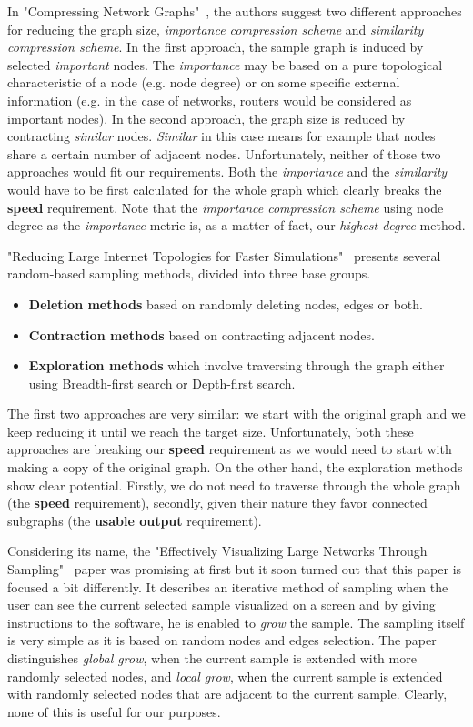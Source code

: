 In "Compressing Network Graphs"~\cite{gilbert2004compressing}, the authors suggest two different approaches for reducing the graph size, \emph{importance compression scheme} and \emph{similarity compression scheme}. In the first approach, the sample graph is induced by selected \emph{important} nodes. The \emph{importance} may be based on a pure topological characteristic of a node (e.g. node degree) or on some specific external information (e.g. in the case of networks, routers would be considered as important nodes). In the second approach, the graph size is reduced by contracting \emph{similar} nodes. \emph{Similar} in this case means for example that nodes share a certain number of adjacent nodes. Unfortunately, neither of those two approaches would fit our requirements. Both the \emph{importance} and the \emph{similarity} would have to be first calculated for the whole graph which clearly breaks the \textbf{speed} requirement. Note that the \emph{importance compression scheme} using node degree as the \emph{importance} metric is, as a matter of fact, our \emph{highest degree} method.

"Reducing Large Internet Topologies for Faster Simulations"~\cite{krishnamurthy2005reducing} presents several random-based sampling methods, divided into three base groups.

\begin{itemize}
\item \textbf{Deletion methods} based on randomly deleting nodes, edges or both.
\item \textbf{Contraction methods} based on contracting adjacent nodes.
\item \textbf{Exploration methods} which involve traversing through the graph either using Breadth-first search or Depth-first search.
\end{itemize}

The first two approaches are very similar: we start with the original graph and we keep reducing it until we reach the target size. Unfortunately, both these approaches are breaking our \textbf{speed} requirement as we would need to start with making a copy of the original graph. On the other hand, the exploration methods show clear potential. Firstly, we do not need to traverse through the whole graph (the \textbf{speed} requirement), secondly, given their nature they favor connected subgraphs (the \textbf{usable output} requirement).

Considering its name, the "Effectively Visualizing Large Networks Through Sampling"~\cite{rafiei2005effectively} paper was promising at first but it soon turned out that this paper is focused a bit differently. It describes an iterative method of sampling when the user can see the current selected sample visualized on a screen and by giving instructions to the software, he is enabled to \emph{grow} the sample. The sampling itself is very simple as it is based on random nodes and edges selection. The paper distinguishes \emph{global grow}, when the current sample is extended with more randomly selected nodes, and \emph{local grow}, when the current sample is extended with randomly selected nodes that are adjacent to the current sample. Clearly, none of this is useful for our purposes.

